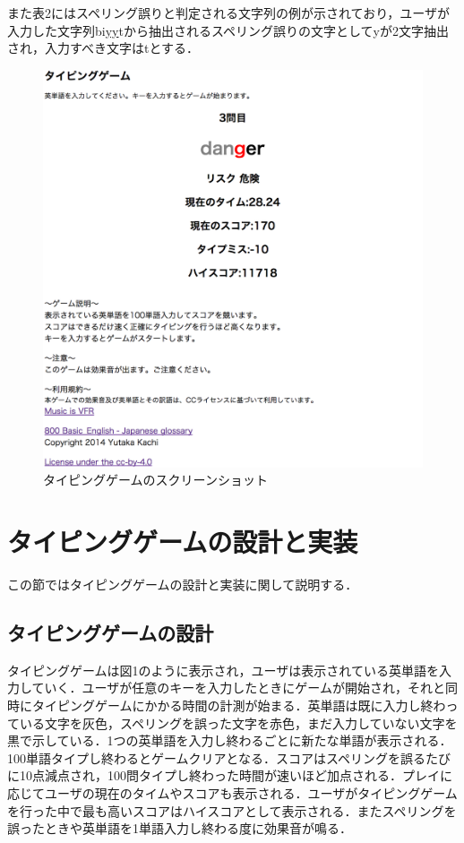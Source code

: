 \documentclass{jarticle}
\begin{document}
また表2にはスペリング誤りと判定される文字列の例が示されており，ユーザが入力した文字列bi\underline{yy}tから抽出されるスペリング誤りの文字としてyが2文字抽出され，入力すべき文字はtとする．

\begin{figure}[t]
	\begin{center}
		\includegraphics[width=15cm]{typing_game2.png}
		\caption{タイピングゲームのスクリーンショット}
		\label{LabelExa}
	\end{center}
\end{figure}

\section{タイピングゲームの設計と実装}

この節ではタイピングゲームの設計と実装に関して説明する．

\subsection{タイピングゲームの設計}
タイピングゲームは図1のように表示され，ユーザは表示されている英単語を入力していく．ユーザが任意のキーを入力したときにゲームが開始され，それと同時にタイピングゲームにかかる時間の計測が始まる．英単語は既に入力し終わっている文字を灰色，スペリングを誤った文字を赤色，まだ入力していない文字を黒で示している．1つの英単語を入力し終わるごとに新たな単語が表示される．100単語タイプし終わるとゲームクリアとなる．スコアはスペリングを誤るたびに10点減点され，100問タイプし終わった時間が速いほど加点される．プレイに応じてユーザの現在のタイムやスコアも表示される．ユーザがタイピングゲームを行った中で最も高いスコアはハイスコアとして表示される．またスペリングを誤ったときや英単語を1単語入力し終わる度に効果音が鳴る．
\end{document}
